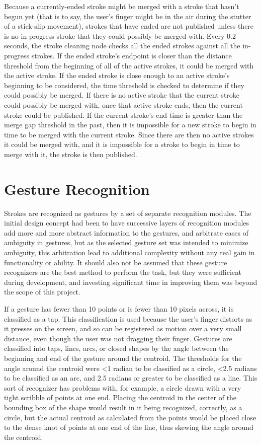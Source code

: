 Because a currently-ended stroke might be merged with a stroke that hasn't begun yet (that is to say, the user's finger might be in the air during the stutter of a stick-slip movement), strokes that have ended are not published unless there is no in-progress stroke that they could possibly be merged with. 
Every 0.2 seconds, the stroke cleaning node checks all the ended strokes against all the in-progress strokes. 
If the ended stroke's endpoint is closer than the distance threshold from the beginning of all of the active strokes, it could be merged with the active stroke. 
If the ended stroke is close enough to an active stroke's beginning to be considered, the time threshold is checked to determine if they could possibly be merged. 
If there is no active stroke that the current stroke could possibly be merged with, once that active stroke ends, then the current stroke could be published.
If the current stroke's end time is greater than the merge gap threshold in the past, then it is impossible for a new stroke to begin in time to be merged with the current stroke. 
Since there are then no active strokes it could be merged with, and it is impossible for a stroke to begin in time to merge with it, the stroke is then published. 

\section{Gesture Recognition}

Strokes are recognized as gestures by a set of separate recognition modules. 
The initial design concept had been to have successive layers of recognition modules add more and more abstract information to the gestures, and arbitrate cases of ambiguity in gestures, but as the selected gesture set was intended to minimize ambiguity, this arbitration lead to additional complexity without any real gain in functionality or ability. 
It should also not be assumed that these gesture recognizers are the best method to perform the task, but they were sufficient during development, and investing significant time in improving them was beyond the scope of this project. 

If a gesture has fewer than 10 points or is fewer than 10 pixels across, it is classified as a tap. 
This classification is used because the user's finger distorts as it presses on the screen, and so can be registered as motion over a very small distance, even though the user was not dragging their finger. 
Gestures are classified into taps, lines, arcs, or closed shapes by the angle between the beginning and end of the gesture around the centroid. 
The thresholds for the angle around the centroid were \textless 1 radian to be classified as a circle, \textless 2.5 radians to be classified as an arc, and 2.5 radians or greater to be classified as a line. 
This sort of recognizer has problems with, for example, a circle drawn with a very tight scribble of points at one end. Placing the centroid in the center of the bounding box of the shape would result in it being recognized, correctly, as a circle, but the actual centroid as calculated from the points would be placed close to the dense knot of points at one end of the line, thus skewing the angle around the centroid. 


